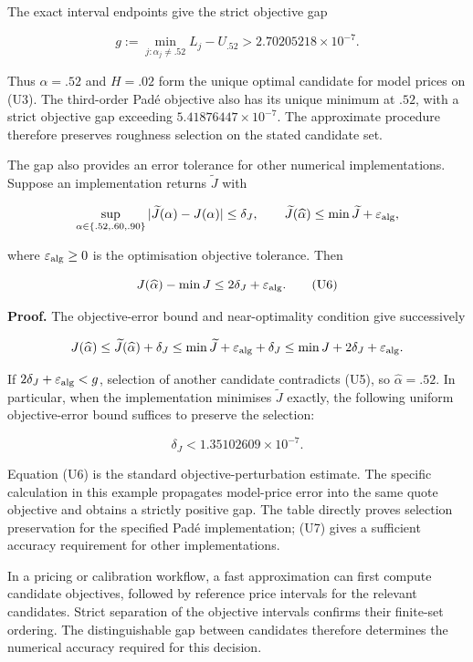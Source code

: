 \documentclass[a4paper,11pt]{article}
\begin{document}
The exact interval endpoints give the strict objective gap

\[
g:=\min_{j:\alpha_j\ne.52}L_j-U_{.52}
>2.70205218\times10^{-7}.
\tag{U5}
\]

Thus $\alpha=.52$ and $H=.02$ form the unique optimal candidate for model prices on (U3). The third-order Padé objective also has its unique minimum at $.52$, with a strict objective gap exceeding $5.41876447\times10^{-7}$. The approximate procedure therefore preserves roughness selection on the stated candidate set.

The gap also provides an error tolerance for other numerical implementations. Suppose an implementation returns $\widetilde J$ with

\[
\sup_{\alpha\in\{.52,.60,.90\}}
|\widetilde J(\alpha)-J(\alpha)|\le\delta_J,
\qquad
\widetilde J(\widehat\alpha)\le\min\widetilde J+\varepsilon_{\rm alg},
\]

where $\varepsilon_{\rm alg}\ge0$ is the optimisation objective tolerance. Then

\[
J(\widehat\alpha)-\min J
\le2\delta_J+\varepsilon_{\rm alg}.
\tag{U6}
\]

\textbf{Proof.} The objective-error bound and near-optimality condition give successively

\[
J(\widehat\alpha)
\le\widetilde J(\widehat\alpha)+\delta_J
\le\min\widetilde J+\varepsilon_{\rm alg}+\delta_J
\le\min J+2\delta_J+\varepsilon_{\rm alg}.
\]

If $2\delta_J+\varepsilon_{\rm alg}<g$, selection of another candidate contradicts (U5), so $\widehat\alpha=.52$. In particular, when the implementation minimises $\widetilde J$ exactly, the following uniform objective-error bound suffices to preserve the selection:

\[
\delta_J<1.35102609\times10^{-7}.
\tag{U7}
\]

Equation (U6) is the standard objective-perturbation estimate. The specific calculation in this example propagates model-price error into the same quote objective and obtains a strictly positive gap. The table directly proves selection preservation for the specified Padé implementation; (U7) gives a sufficient accuracy requirement for other implementations.

In a pricing or calibration workflow, a fast approximation can first compute candidate objectives, followed by reference price intervals for the relevant candidates. Strict separation of the objective intervals confirms their finite-set ordering. The distinguishable gap between candidates therefore determines the numerical accuracy required for this decision.
\end{document}

